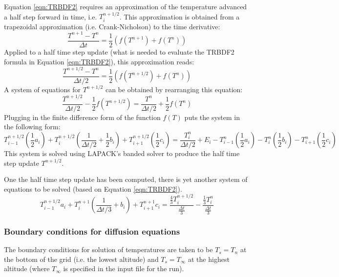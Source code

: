 \documentclass[11pt,letterpaper]{article}
\begin{document}
Equation \ref{eqn:TRBDF2} requires an approximation of the temperature advanced a half step forward in time, i.e. $T_i^{n+1/2}$.  This approximation is obtained from a trapezoidal approximation (i.e. Crank-Nicholson) to the time derivative:
\begin{equation}
\frac{T^{n+1} - T^n}{\Delta t} = \frac{1}{2} \left( f(T^{n+1}) + f(T^n) \right)
\end{equation}
Applied to a half time step update (what is needed to evaluate the TRBDF2 formula in Equation \ref{eqn:TRBDF2}), this approximation reads:
\begin{equation}
\frac{T^{n+1/2} - T^n}{\Delta t/2} = \frac{1}{2} \left( f(T^{n+1/2}) + f(T^n) \right)
\end{equation}
A system of equations for $T^{n+1/2}$ can be obtained by rearranging this equation:
\begin{equation}
\frac{T^{n+1/2}}{\Delta t/2} - \frac{1}{2} f(T^{n+1/2})= \frac{T^n}{\Delta t/2} + \frac{1}{2} f(T^n)
\end{equation}
Plugging in the finite difference form of the function $f(T)$ puts the system in the following form:
\begin{equation}
T^{n+1/2}_{i-1} \left( \frac{1}{2} a_i \right) + T^{n+1/2}_i \left( \frac{1}{\Delta t/2} + \frac{1}{2} b_i \right) + T^{n+1/2}_{i+1} \left( \frac{1}{2} c_i \right)  = \frac{T^n_i}{\Delta t/2} + E_i - T^{n}_{i-1} \left( \frac{1}{2} a_i \right) - T^{n}_i \left( \frac{1}{2} b_i \right) - T^{n}_{i+1} \left( \frac{1}{2} c_i \right) 
\end{equation}
This system is solved using LAPACK's banded solver to produce the half time step update $T^{n+1/2}$.

One the half time step update has been computed, there is yet another system of equations to be solved (based on Equation \ref{eqn:TRBDF2}).   
\begin{equation}
T^{n+1/2}_{i-1} a_i + T^{n+1}_i \left( \frac{1}{\Delta t/3} + b_i \right) + T^{n+1}_{i+1} c_i = \frac{\frac{4}{3} T_i^{n+1/2}}{\frac{\Delta t}{3}} - \frac{\frac{1}{3} T_i^{n}}{\frac{\Delta t}{3}} \label{eqn:TRBDF2}
\end{equation}


\subsubsection{Boundary conditions for diffusion equations}

The boundary conditions for solution of temperatures are taken to be $T_s=T_n$ at the bottom of the grid (i.e. the lowest altitude) and $T_s=T_\infty$ at the highest altitude (where $T_\infty$ is specified in the input file for the run).  
\end{document}
